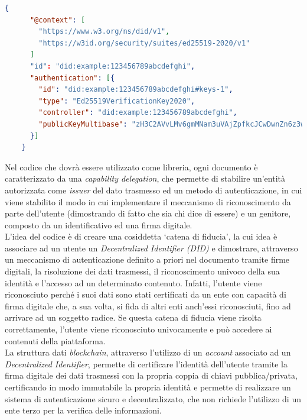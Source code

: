 \begin{lstlisting}[language=json]
    {
      "@context": [
        "https://www.w3.org/ns/did/v1",
        "https://w3id.org/security/suites/ed25519-2020/v1"
      ]
      "id": "did:example:123456789abcdefghi",
      "authentication": [{    
        "id": "did:example:123456789abcdefghi#keys-1",
        "type": "Ed25519VerificationKey2020",
        "controller": "did:example:123456789abcdefghi",
        "publicKeyMultibase": "zH3C2AVvLMv6gmMNam3uVAjZpfkcJCwDwnZn6z3wXmqPV"
      }]
    }
\end{lstlisting}

\newpage

Nel codice che dovrà essere utilizzato come libreria,
ogni documento è caratterizzato da una \textit{capability delegation}, che permette di stabilire un'entità autorizzata come \textit{issuer} del dato trasmesso ed 
un metodo di autenticazione, in cui viene stabilito il modo in cui implementare il meccanismo di riconoscimento da parte dell'utente (dimostrando di fatto che sia chi dice di essere) e un 
genitore, composto da un identificativo ed una firma digitale. \\

L'idea del codice è di creare una cosiddetta `catena di fiducia', la cui idea è associare ad un utente un \textit{Decentralized Identifier (DID)} e dimostrare,
attraverso un meccanismo di autenticazione definito a priori nel documento tramite firme digitali, la risoluzione dei dati trasmessi, il riconoscimento univoco della sua identità
e l'accesso ad un determinato contenuto. Infatti, l'utente viene riconosciuto perché i suoi dati sono stati certificati da un ente 
con capacità di firma digitale che, a sua volta, si fida di altri enti anch'essi riconosciuti, fino ad arrivare ad un soggetto radice.
Se questa catena di fiducia viene risolta correttamente, l'utente viene riconosciuto univocamente e può accedere ai contenuti della piattaforma. \\

La struttura dati \textit{blockchain}, attraverso l'utilizzo di un \textit{account} associato ad un \textit{Decentralized Identifier}, permette di certificare l'identità dell'utente
tramite la firma digitale dei dati trasmessi con la propria coppia di chiavi pubblica/privata, certificando in modo immutabile la propria identità e
permette di realizzare un sistema di autenticazione sicuro e decentralizzato, che non richiede l'utilizzo di un ente terzo per la verifica delle informazioni. \\

